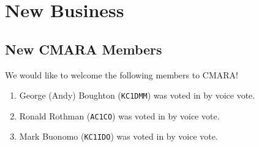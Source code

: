 \documentclass[10pt,letterpaper]{article}
\begin{document}
\section{New Business}

\subsection{New CMARA Members}
\label{new-cmara-members}
We would like to welcome the following members to CMARA!
\begin{enumerate}
  \item George (Andy) Boughton (\texttt{KC1DMM}) was voted in by voice vote.
  \item Ronald Rothman (\texttt{AC1CO}) was voted in by voice vote.
  \item Mark Buonomo (\texttt{KC1IDO}) was voted in by voice vote.
\end{enumerate}
\end{document}
